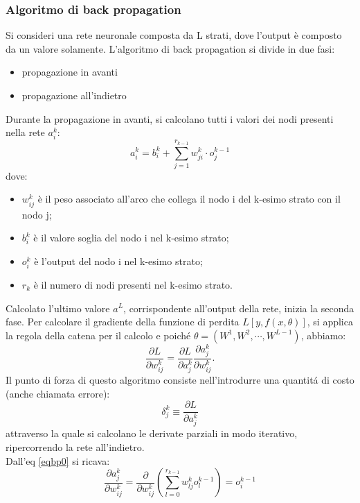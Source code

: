\documentclass[a4paper,12pt]{report}
\begin{document}
\subsubsection{Algoritmo di back propagation}\label{back-prop}
Si consideri una rete neuronale composta da L strati, dove l'output \`e composto da un valore solamente.
L'algoritmo di back propagation si divide in due fasi:
\begin{itemize}
\item propagazione in avanti
\item propagazione all'indietro
\end{itemize}
Durante la propagazione in avanti, si calcolano tutti i valori dei nodi presenti nella rete $a_{i}^k$:
\begin{equation}\label{eqbp0}
a_{i}^{k}=b_{i}^{k}+\sum_{j=1}^{r_{k-1}} w_{ji}^{k}\cdot o_{j}^{k-1}
\end{equation}
dove:
\begin{itemize}
\item $w_{ij}^{k}$ \`e il peso associato all'arco che collega il nodo i del k-esimo strato con il nodo j;
\item $b_{i}^{k}$ \`e il valore soglia del nodo i nel k-esimo strato;
\item $o_{i}^{k}$ \`e l'output del nodo i nel k-esimo strato;
\item $r_k$ \`e il numero di nodi presenti nel k-esimo strato.
\end{itemize}
Calcolato l'ultimo valore $a^{L}$, corrispondente all'output della rete, inizia la seconda fase. Per calcolare il gradiente della funzione di perdita $L[y,f(x,\theta)]$, si applica la regola della catena per il calcolo e poich\'{e} $\theta = (W^1,W^2,\cdots ,W^{L-1})$, abbiamo:
\begin{equation}\label{eqbp1}
\frac{\partial L}{\partial w_{ij}^k}=\frac{\partial L}{\partial a_j^k}\frac{\partial a_j^k}{\partial w_{ij}^k}.
\end{equation}
Il punto di forza di questo algoritmo consiste nell'introdurre una quantit\'{a} di costo (anche chiamata errore):
\begin{equation}\label{eqbp2}
\delta_j^k\equiv \frac{\partial L}{\partial a_j^k}
\end{equation}
attraverso la quale si calcolano le derivate parziali in modo iterativo, ripercorrendo la rete all'indietro.\\
Dall'eq \ref{eqbp0} si ricava:
\begin{equation}
\frac{\partial a_j^k}{\partial w_{ij}^k}=\frac{\partial}{\partial w_{ij}^k}\left( \sum_{l=0}^{r_{k-1}}w_{lj}^k o_l^{k-1}\right)=o_i^{k-1}
\end{equation}
\end{document}
